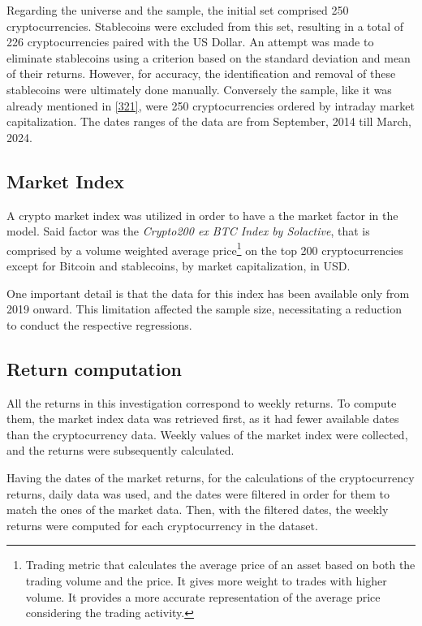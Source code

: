 Regarding the universe and the sample, the initial set comprised 250 cryptocurrencies. Stablecoins were excluded from this set, resulting in a total of 226 cryptocurrencies paired with the US Dollar. An attempt was made to eliminate stablecoins using a criterion based on the standard deviation and mean of their returns. However, for accuracy, the identification and removal of these stablecoins were ultimately done manually. Conversely the sample, like it was already mentioned in \ref{321}, were 250 cryptocurrencies ordered by intraday market capitalization. The dates ranges of the data are from September, 2014 till March, 2024.

\subsection{Market Index}
A crypto market index was utilized in order to have a the market factor in the model. Said factor was the \textit{Crypto200 ex BTC Index by Solactive}, that is comprised by a volume weighted average price\footnote{Trading metric that calculates the average price of an asset based on both the trading volume and the price. It gives more weight to trades with higher volume. It provides a more accurate representation of the average price considering the trading activity.} on the top 200 cryptocurrencies except for Bitcoin and stablecoins, by market capitalization, in USD.

One important detail is that the data for this index has been available only from 2019 onward. This limitation affected the sample size, necessitating a reduction to conduct the respective regressions.

\subsection{Return computation}
All the returns in this investigation correspond to weekly returns. To compute them, the market index data was retrieved first, as it had fewer available dates than the cryptocurrency data. Weekly values of the market index were collected, and the returns were subsequently calculated.

Having the dates of the market returns, for the calculations of the cryptocurrency returns, daily data was used, and the dates were filtered in order for them to match the ones of the market data. Then, with the filtered dates, the weekly returns were computed for each cryptocurrency in the dataset.

